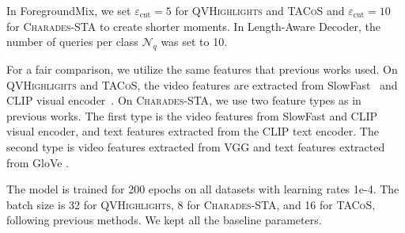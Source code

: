 In ForegroundMix, we set \(\varepsilon_\text{cut}=5\) for \textsc{QVHighlights} and \textsc{TACoS} and  \(\varepsilon_\text{cut}=10\) for \textsc{Charades-STA} to create shorter moments. In Length-Aware Decoder, the number of queries per class $ \mathcal{N}_q$ was set to 10. 

For a fair comparison, we utilize the same features that previous works used. 
On \textsc{QVHighlights} and \textsc{TACoS}, the video features are extracted from SlowFast~\cite{feichtenhofer2019slowfast_slowfast} and CLIP visual encoder~\cite{radford2021learning_CLIP}.
On \textsc{Charades-STA}, we use two feature types as in previous works.
The first type is the video features from SlowFast and CLIP visual encoder, and text features extracted from the CLIP text encoder.
The second type is video features extracted from VGG \cite{simonyan2014very_vgg} and text features extracted from GloVe \cite{pennington2014glove_glove}. 

The model is trained for 200 epochs on all datasets with learning rates 1e-4. The batch size is 32 for \textsc{QVHighlights}, 8 for \textsc{Charades-STA}, and 16 for \textsc{TACoS}, following previous methods. We kept all the baseline parameters.

